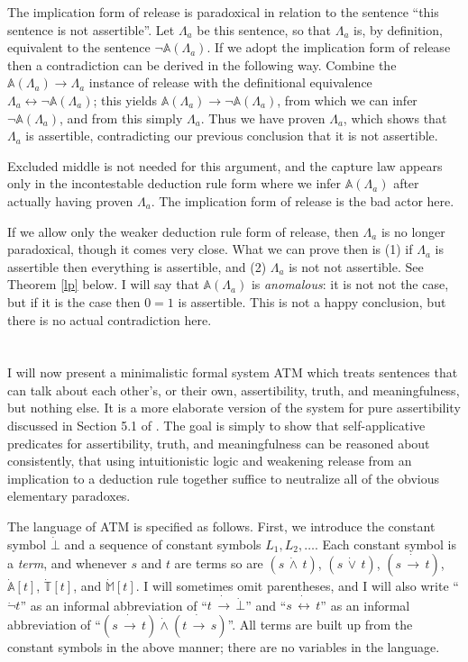 \documentclass{amsart}
\theoremstyle{definition}
\begin{document}
The implication form of release is paradoxical in relation to the sentence ``this sentence is not assertible''. Let $\Lambda_a$ be this sentence, so that $\Lambda_a$ is, by definition, equivalent to the sentence $\neg \mathbb{A}(\Lambda_a)$. If we adopt the implication form of release then a contradiction can be derived in the following way.
Combine the $\mathbb{A}(\Lambda_a) \to \Lambda_a$ instance of release with the definitional equivalence $\Lambda_a \leftrightarrow \neg \mathbb{A}(\Lambda_a)$; this yields $\mathbb{A}(\Lambda_a) \to \neg\mathbb{A}(\Lambda_a)$, from which we can infer $\neg\mathbb{A}(\Lambda_a)$, and from this simply $\Lambda_a$. Thus we have proven $\Lambda_a$, which shows that $\Lambda_a$ is assertible, contradicting our previous conclusion that it is not assertible.

Excluded middle is not needed for this argument, and the capture law appears only in the incontestable deduction rule form where we infer $\mathbb{A}(\Lambda_a)$ after actually having proven $\Lambda_a$. The implication form of release is the bad actor here.

If we allow only the weaker deduction rule form of release, then $\Lambda_a$ is no longer paradoxical, though it comes very close. What we can prove then is (1) if $\Lambda_a$ is assertible then everything is assertible, and (2) $\Lambda_a$ is not not assertible. See Theorem \ref{lp} below. I will say that $\mathbb{A}(\Lambda_a)$ is {\it anomalous}: it is not not the case, but if it is the case then $0 = 1$ is assertible. This is not a happy conclusion, but there is no actual contradiction here.

\section{}

I will now present a minimalistic formal system ATM which treats sentences that can talk about each other's, or their own, assertibility, truth, and meaningfulness, but nothing else. It is a more elaborate version of the system for pure assertibility discussed in Section 5.1 of \cite{weaver}. The goal is simply to show that self-applicative predicates for assertibility, truth, and meaningfulness can be reasoned about consistently, that using intuitionistic logic and weakening release from an implication to a deduction rule together suffice to neutralize all of the obvious elementary paradoxes.

The language of ATM is specified as follows. First, we introduce the constant symbol $\dot{\bot}$ and a sequence of constant symbols $L_1, L_2, \ldots$. Each constant symbol is a {\it term}, and whenever $s$ and $t$ are terms so are $(s\, \dot{\wedge}\, t)$, $(s\, \dot{\vee}\, t)$, $(s\, \dot{\to}\, t)$, $\dot{\mathbb{A}}[t]$, $\dot{\mathbb{T}}[t]$, and $\dot{\mathbb{M}}[t]$. I will sometimes omit parentheses, and I will also write ``$\dot{\neg}t$'' as an informal abbreviation of ``$t\, \dot{\to}\, \dot{\bot}$'' and ``$s\,\dot{\leftrightarrow}\, t$'' as an informal abbreviation of ``$(s\,\dot{\to}\, t) \dot{\wedge} (t \,\dot{\to}\, s)$''. All terms are built up from the constant symbols in the above manner; there are no variables in the language.
\end{document}
